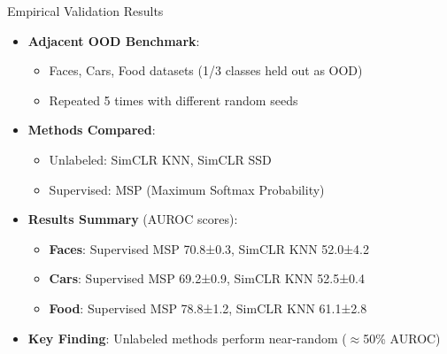 \documentclass[aspectratio=169]{beamer}
\begin{document}
\begin{frame}{Empirical Validation Results}
\begin{itemize}
    \item \textbf{Adjacent OOD Benchmark}:
    \begin{itemize}
        \item Faces, Cars, Food datasets (1/3 classes held out as OOD)
        \item Repeated 5 times with different random seeds
    \end{itemize}
    \item \textbf{Methods Compared}:
    \begin{itemize}
        \item Unlabeled: SimCLR KNN, SimCLR SSD
        \item Supervised: MSP (Maximum Softmax Probability)
    \end{itemize}
    \item \textbf{Results Summary} (AUROC scores):
    \begin{itemize}
        \item \textbf{Faces}: Supervised MSP 70.8±0.3, SimCLR KNN 52.0±4.2
        \item \textbf{Cars}: Supervised MSP 69.2±0.9, SimCLR KNN 52.5±0.4
        \item \textbf{Food}: Supervised MSP 78.8±1.2, SimCLR KNN 61.1±2.8
    \end{itemize}
    \item \textbf{Key Finding}: Unlabeled methods perform near-random ($\approx$50\% AUROC)
\end{itemize}
\end{frame}
\end{document}
